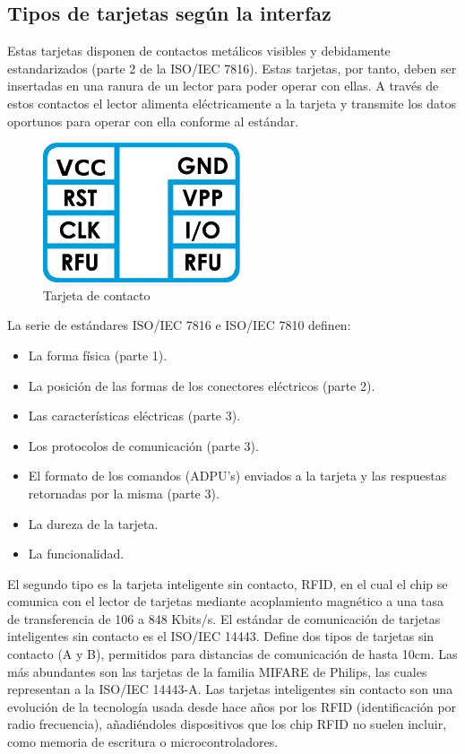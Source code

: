 \subsection{Tipos de tarjetas según la interfaz}

\bigskip
{}

Estas tarjetas disponen de contactos metálicos visibles y debidamente estandarizados (parte 2 de la ISO/IEC 7816). Estas tarjetas, por tanto, deben ser insertadas en una ranura de un lector para poder operar con ellas. A través de estos contactos el lector alimenta eléctricamente a la tarjeta y transmite los datos oportunos para operar con ella conforme al estándar.

\begin{figure}[H]
\centering
  \begin{center}
  \includegraphics[scale=.3]{Imagenes/sc1.jpg} 
  \end{center}
  \caption{Tarjeta de contacto}\label{Fig:SC_c} 
\end{figure}

La serie de estándares ISO/IEC 7816 e ISO/IEC 7810 definen:

\begin{itemize}
\item La forma física (parte 1). 
\item La posición de las formas de los conectores eléctricos (parte 2). 
\item Las características eléctricas (parte 3). 
\item Los protocolos de comunicación (parte 3).
\item El formato de los comandos (ADPU's) enviados a la tarjeta y las respuestas retornadas por la misma (parte 3).
\item La dureza de la tarjeta.
\item La funcionalidad.
\end{itemize}


\bigskip
{}

El segundo tipo es la tarjeta inteligente sin contacto, RFID,  en el cual el chip se comunica con el lector de tarjetas mediante acoplamiento magnético a una tasa de transferencia de 106 a 848 Kbits/s.
El estándar de comunicación de tarjetas inteligentes sin contacto es el ISO/IEC 14443. Define dos tipos de tarjetas sin contacto (A y B), permitidos para distancias de comunicación de hasta 10cm. Las más abundantes son las tarjetas de la familia MIFARE de Philips, las cuales representan a la ISO/IEC 14443-A.
Las tarjetas inteligentes sin contacto son una evolución de la tecnología usada desde hace años por los RFID (identificación por radio frecuencia), añadiéndoles dispositivos que los chip RFID no suelen incluir, como memoria de escritura o microcontroladores.

